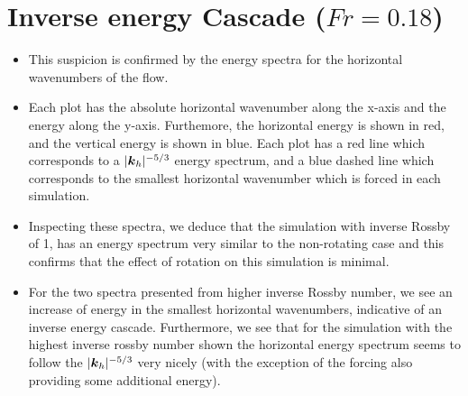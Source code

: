 \documentclass{article}
\begin{document}
\section{Inverse energy Cascade ($Fr = 0.18$)}
\begin{itemize}
    \item This suspicion is confirmed by the energy spectra for the horizontal
    wavenumbers of the flow. 
    \item Each plot has the absolute horizontal wavenumber along the x-axis and
    the energy along the y-axis. Furthemore, the horizontal energy is shown in red, and the vertical
    energy is shown in blue. Each plot has a red line which corresponds to a
    $|\boldsymbol{k}_h|^{-5/3}$ energy spectrum, and a blue dashed line which
    corresponds to the smallest horizontal wavenumber which is forced in each
    simulation. 
    \item Inspecting these spectra, we deduce that the simulation with inverse
    Rossby of 1, has an energy spectrum very similar to the non-rotating case
    and this confirms that the effect of rotation on this simulation is minimal. 
    \item For the two spectra presented from higher inverse Rossby number, we
    see an increase of energy in the smallest horizontal wavenumbers, indicative
    of an inverse energy cascade. Furthermore, we see that for the simulation
    with the highest inverse rossby number shown the horizontal energy spectrum
    seems to follow the $|\boldsymbol{k}_h|^{-5/3}$ very nicely (with the exception of
    the forcing also providing some additional energy). 
\end{itemize}
\end{document}
